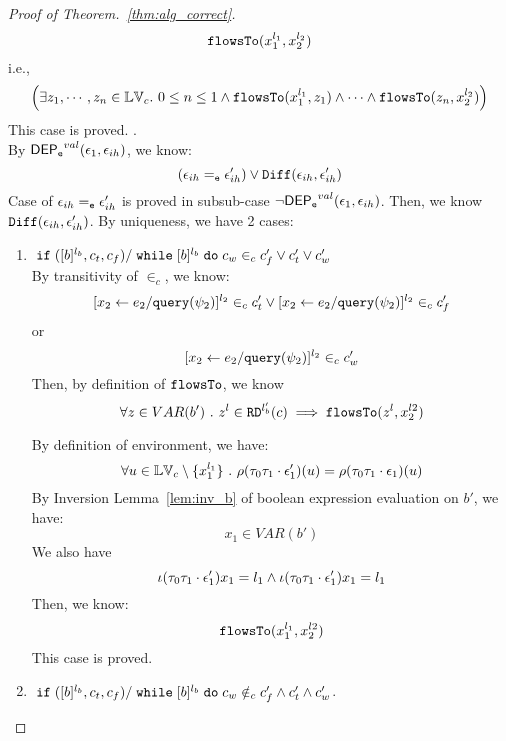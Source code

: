 \begin{proof}[Proof of Theorem.~\ref{thm:alg_correct}]
 \[
 \mathtt{flowsTo}(x_1^{l_1}, x_2^{l_2})
 \]
 i.e.,
 \[
 \Big( \exists z_1, \cdots, z_n \in \mathbb{LV}_{{c}}. ~ 0 \leq n \leq 1 \land
  \mathtt{flowsTo}(x_1^{l_1}, z_1) 
  \land \cdots \land \mathtt{flowsTo}(z_n, x_2^{l_2}) \Big)
 \]
  This case is proved.
%
.
\\
By $\mathsf{DEP_{\mathtt{e}}}^{val}(\mathtt{\epsilon}_1, \mathtt{\epsilon}_{ih})$, we know:
\[
  (\mathtt{\epsilon}_{ih} =_{\mathtt{e}} \mathtt{\epsilon}_{ih}') \lor \mathtt{Diff}(\mathtt{\epsilon}_{ih}, \mathtt{\epsilon}_{ih}')
\]
Case of $\mathtt{\epsilon}_{ih} =_{\mathtt{e}} \mathtt{\epsilon}_{ih}'$ is proved in subsub-case $\neg \mathsf{DEP_{\mathtt{e}}}^{val}(\mathtt{\epsilon}_1, \mathtt{\epsilon}_{ih})$.
%
Then, we know $\mathtt{Diff}(\mathtt{\epsilon}_{ih}, \mathtt{\epsilon}_{ih}')$. By uniqueness, we have 2 cases:
\begin{enumerate}
  \item $\;\mathtt{if}\;([b]{}^{l_b}, c_t, c_f) / \;\mathtt{while}\; [b]{}^{l_b} \;\mathtt{do}\; c_w \in_c c_f' \lor c_t' \lor c_w'$
  \\
  By transitivity of $\in_c$, we know:
  \[
  [\mathrel{ {x}_2 \leftarrow e_2 / {\tt query}(\psi_2) }]^{l_2} \in_c c_t'
  \lor
  [\mathrel{ {x}_2 \leftarrow e_2 / {\tt query}(\psi_2) }]^{l_2} \in_c c_f'
\]
or
\[
    [\mathrel{ {x}_2 \leftarrow e_2 / {\tt query}(\psi_2) }]^{l_2} \in_c c_w'
\]
%
Then, by definition of $\mathtt{flowsTo}$, we know
\begin{equation}
 \forall z \in VAR(b') ~.~ z^l \in \mathtt{RD}^{l_b'}(c) \implies \mathtt{flowsTo}(z^l, x_2^{l2})
\end{equation} 

 By definition of environment, we have:
\[
  \forall u \in \mathbb{LV}_c \setminus \{x_1^{l_1}\} ~.~
  \rho(\mathtt{\tau}_0 \mathtt{\tau}_1 \cdot \mathtt{\epsilon}_1') (u) =  
  \rho(\mathtt{\tau}_0 \mathtt{\tau}_1 \cdot \mathtt{\epsilon}_1) (u)
\]
%
By {Inversion Lemma~\ref{lem:inv_b}} of boolean expression evaluation on $b'$, we have:
 \[
  x_1 \in VAR(b')
 \]
 We also have 
 $$
 \iota(\mathtt{\tau}_0 \mathtt{\tau}_1 \cdot \mathtt{\epsilon}_1') x_1 = l_1
 \land 
 \iota(\mathtt{\tau}_0 \mathtt{\tau}_1 \cdot \mathtt{\epsilon}_1') x_1 = l_1
 $$
 Then, we know:
 \[
 \mathtt{flowsTo}(x_1^{l_1}, x_2^{l2})
 \]
 This case is proved.
\item $\;\mathtt{if}\;([b]{}^{l_b}, c_t, c_f) / \;\mathtt{while}\; [b]{}^{l_b} \;\mathtt{do}\; c_w \notin_c c_f' \land c_t' \land c_w'$.


\end{enumerate}
\end{proof}

